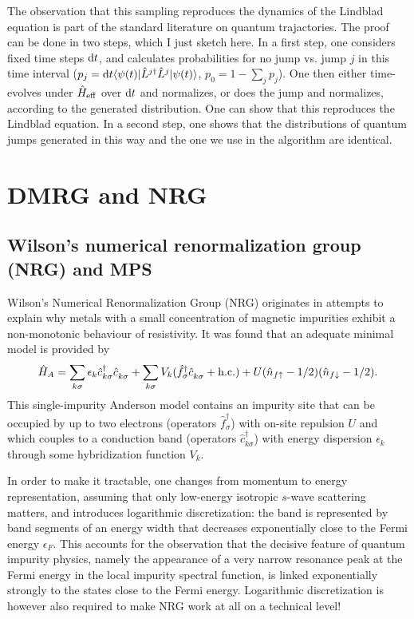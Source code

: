 \documentclass[a4paper,10pt,oneside,onecolumn,1p,times]{elsarticle}
\newcommand{\diff}{{\rm d}}
\newcommand{\bra}[1]{\mbox{$\langle #1  |$}}
\newcommand{\ket}[1]{\mbox{$| #1  \rangle$}}
\begin{document}
The observation that this sampling reproduces the dynamics of the Lindblad equation is part of the standard literature on quantum trajactories. The proof can be done in two steps, which I just sketch here. In a first step, one considers fixed time steps $\diff t$, and calculates probabilities for no jump vs. jump $j$ in this time interval ($p_j = \diff t \bra{\psi(t)} \hat{L}^{j\dagger} \hat{L}^j \ket{\psi(t)}$, $p_0 = 1 - \sum_j p_j$). One then either time-evolves under $\hat{H}_{{\rm eff}}$ over $\diff t$ and normalizes, or does the jump and normalizes, according to the generated distribution. One can show that this reproduces the Lindblad equation. In a second step, one shows that the distributions of quantum jumps generated in this way and the one we use in the algorithm are identical.

\section{DMRG and NRG}
\subsection{Wilson's numerical renormalization group (NRG) and MPS}
Wilson's Numerical Renormalization Group (NRG) \cite{Wilson75,Bulla08,Krishnamurthy80} originates in attempts to explain why metals with a small concentration of magnetic impurities exhibit a non-monotonic behaviour of resistivity.
It was found that an adequate minimal model is provided by 
\begin{equation}
\hat{H}_A = \sum_{k\sigma} \epsilon_k \hat{c}^\dagger_{k\sigma} \hat{c}^{\phantom\dagger}_{k\sigma} + \sum_{k\sigma} V_k (\hat{f}^\dagger_\sigma \hat{c}^{\phantom\dagger}_{k\sigma} + {\rm h.c.}) + U (\hat{n}_{f\uparrow}-1/2) (\hat{n}_{f\downarrow}-1/2).
\end{equation}
This single-impurity Anderson model contains an impurity site that can be occupied by up to two electrons (operators $\hat{f}^\dagger_\sigma$) with on-site repulsion $U$ and which couples to a conduction band (operators $\hat{c}^\dagger_{k\sigma}$) with energy dispersion $\epsilon_k$ through some hybridization function $V_k$.

In order to make it tractable, one changes from momentum to energy representation, assuming that only low-energy isotropic $s$-wave scattering matters, and introduces logarithmic discretization: the band is represented by band segments of an energy width that decreases exponentially close to the Fermi energy $\epsilon_F$. This accounts for the observation that the decisive feature of quantum impurity physics, namely the appearance of a very narrow resonance peak at the Fermi energy in the local impurity spectral function, is linked exponentially strongly to the states close to the Fermi energy. Logarithmic discretization is however also required to make NRG work at all on a technical level!
\end{document}

